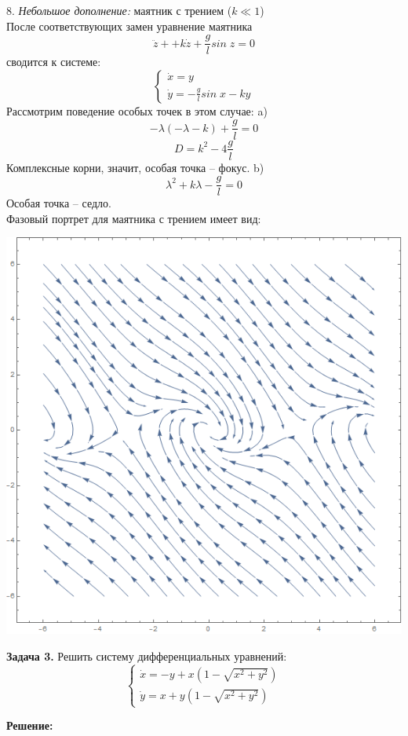 \documentclass[10pt]{report}
\begin{document}
8. \textit{Небольшое дополнение:} маятник с трением ($k\ll 1$)\\
После соответствующих замен уравнение маятника
\[\ddot{z}++k\dot{z}+\frac g l sin\;z=0\]
сводится к системе:
\[ \left\{
\begin{array}{lr}
\dot{x}=y\\
\dot{y}=- \frac g l sin\;x-ky
\end{array}
\right.\]
Рассмотрим поведение особых точек в этом случае:
a)\[-\lambda(-\lambda-k)+\frac g l =0\]
\[D=k^2-4\frac g l \]
Комплексные корни, значит, особая точка -- фокус.
b)\[\lambda^2+k\lambda-\frac g l =0\]
Особая точка -- седло.\\
Фазовый портрет для маятника с трением имеет вид:
\begin{center} 
{\includegraphics[scale=0.6]{graph13.5.png}} 
\end{center}

\textbf{Задача 3.} Решить систему дифференциальных уравнений:
\begin{equation}
\left\{
\begin{array}{lr}
\dot{x}=-y+x(1-\sqrt{x^2+y^2})\\
\dot{y}=x+y(1-\sqrt{x^2+y^2})
\end{array}
\right.
\end{equation}

\textbf{Решение:}
\end{document}
